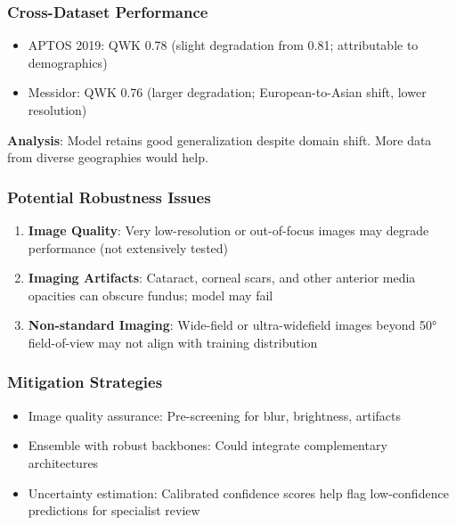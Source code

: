 \subsubsection{Cross-Dataset Performance}

\begin{itemize}
    \item APTOS 2019: QWK 0.78 (slight degradation from 0.81; attributable to demographics)
    \item Messidor: QWK 0.76 (larger degradation; European-to-Asian shift, lower resolution)
\end{itemize}

\textbf{Analysis}: Model retains good generalization despite domain shift. More data from diverse geographies would help.

\subsubsection{Potential Robustness Issues}

\begin{enumerate}
    \item \textbf{Image Quality}: Very low-resolution or out-of-focus images may degrade performance (not extensively tested)
    
    \item \textbf{Imaging Artifacts}: Cataract, corneal scars, and other anterior media opacities can obscure fundus; model may fail
    
    \item \textbf{Non-standard Imaging}: Wide-field or ultra-widefield images beyond 50° field-of-view may not align with training distribution
\end{enumerate}

\subsubsection{Mitigation Strategies}

\begin{itemize}
    \item Image quality assurance: Pre-screening for blur, brightness, artifacts
    \item Ensemble with robust backbones: Could integrate complementary architectures
    \item Uncertainty estimation: Calibrated confidence scores help flag low-confidence predictions for specialist review
\end{itemize}

